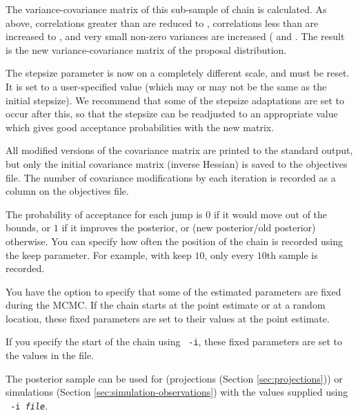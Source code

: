 The variance-covariance matrix of this sub-sample of chain is calculated. As above, correlations greater than  are reduced to , correlations less than  are increased to  , and very small non-zero variances are increased ( and . The result is the new variance-covariance matrix of the proposal distribution. \COO

The stepsize parameter is now on a completely different scale, and must be reset. It is set to a user-specified value (which may or may not be the same as the initial stepsize). We recommend that some of the stepsize adaptations are set to occur after this, so that the stepsize can be readjusted to an appropriate value which gives good acceptance probabilities with the new matrix. \COO

All modified versions of the covariance matrix are printed to the standard output, but only the initial covariance matrix (inverse Hessian) is saved to the objectives file. The number of covariance modifications by each iteration is recorded as a column on the objectives file. \COO 

The probability of acceptance for each jump is $0$ if it would move out of the bounds, or $1$ if it improves the posterior, or (new posterior/old posterior) otherwise. You can specify how often the position of the chain is recorded using the keep parameter. For example, with keep $10$, only every $10$th sample is recorded. 

You have the option to specify that some of the estimated parameters are fixed during the MCMC. If the chain starts at the point estimate or at a random location, these fixed parameters are set to their values at the point estimate.

If you specify the start of the chain using \texttt{\cname\ -i}, these fixed parameters are set to the values in the file. \COO

The posterior sample can be used for (projections (Section \ref{sec:projections})\COO) or 
simulations (Section \ref{sec:simulation-observations}) with the values supplied using \texttt{\cname\ -i \emph{file}}.


